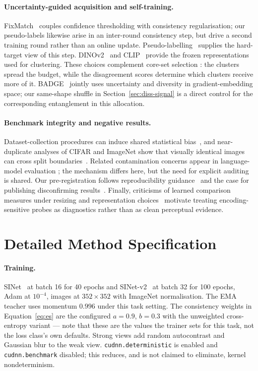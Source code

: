 \documentclass{article} %
\begin{document}
\paragraph{Uncertainty-guided acquisition and self-training.}
FixMatch~\cite{sohn2020fixmatch} couples confidence thresholding with consistency regularisation;
our pseudo-labels likewise arise in an inter-round consistency step, but drive a second training
round rather than an online update. Pseudo-labelling~\cite{lee2013pseudo} supplies the hard-target
view of this step. DINOv2~\cite{oquab2024dinov2} and CLIP~\cite{radford2021learning} provide the
frozen representations used for clustering. These choices complement core-set selection
\cite{sener2018active}: the clusters spread the budget, while the disagreement scores determine
which clusters receive more of it. BADGE~\cite{ash2020deep} jointly uses uncertainty and diversity
in gradient-embedding space; our same-shape shuffle in Section~\ref{sec:diss-signal} is a direct
control for the corresponding entanglement in this allocation.

\paragraph{Benchmark integrity and negative results.}
Dataset-collection procedures can induce shared statistical bias~\cite{torralba2011unbiased}, and
near-duplicate analyses of CIFAR and ImageNet show that visually identical images can cross split
boundaries~\cite{barz2020train}. Related contamination concerns appear in language-model evaluation
\cite{wu2024antileak}; the mechanism differs here, but the need for explicit auditing is shared.
Our pre-registration follows reproducibility guidance~\cite{pineau2021improving} and the case for
publishing disconfirming results~\cite{karl2024position}. Finally, criticisms of learned comparison
measures under resizing and representation choices~\cite{parmar2022aliased,jayasumana2024rethinking}
motivate treating encoding-sensitive probes as diagnostics rather than as clean perceptual evidence.

\section{Detailed Method Specification}
\label{app:method}

\paragraph{Training.} SINet~\cite{fan2020sinet} at batch 16 for 40 epochs and SINet-v2~\cite{fan2022concealed} at batch 32 for 100 epochs, Adam at
$10^{-4}$, images at $352 \times 352$ with ImageNet normalisation. The EMA teacher uses momentum
$0.996$ under this task setting. The consistency weights in Equation~\ref{eq:es} are the configured
$a = 0.9$, $b = 0.3$ with the unweighted cross-entropy variant --- note that these are the values the
trainer sets for this task, not the loss class's own defaults. Strong views add random autocontrast
and Gaussian blur to the weak view. \texttt{cudnn.deterministic} is enabled and
\texttt{cudnn.benchmark} disabled; this reduces, and is not claimed to eliminate, kernel
nondeterminism.
\end{document}
